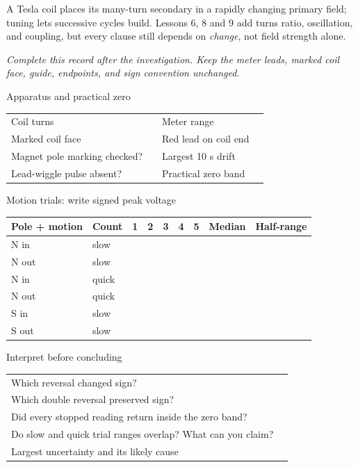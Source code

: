  A Tesla coil places its many-turn secondary
in a rapidly changing primary field; tuning lets successive cycles build.
Lessons 6, 8 and 9 add turns ratio, oscillation, and coupling, but every clause
still depends on \emph{change}, not field strength alone.
\lowvoltagenote

\clearpage
{}
\textit{Complete this record after the investigation. Keep the meter leads,
marked coil face, guide, endpoints, and sign convention unchanged.}

\begin{teloscard}{Apparatus and practical zero}
\begin{tabularx}{\linewidth}{@{}p{.28\linewidth}L p{.25\linewidth}L@{}}
\toprule
Coil turns & & Meter range & \\
Marked coil face & & Red lead on coil end & \\
Magnet pole marking checked? & & Largest 10 s drift & \\
Lead-wiggle pulse absent? & & Practical zero band & \\
\bottomrule
\end{tabularx}
\end{teloscard}

\begin{teloscard}{Motion trials: write signed peak voltage}
\small
\begin{tabularx}{\linewidth}{@{}p{.13\linewidth}p{.12\linewidth}*{5}{C}p{.12\linewidth}p{.12\linewidth}@{}}
\toprule
Pole + motion & Count & 1 & 2 & 3 & 4 & 5 & Median & Half-range\\
\midrule
N in & slow & & & & & & & \\[1.2em]
N out & slow & & & & & & & \\[1.2em]
N in & quick & & & & & & & \\[1.2em]
N out & quick & & & & & & & \\[1.2em]
S in & slow & & & & & & & \\[1.2em]
S out & slow & & & & & & & \\[1.2em]
\bottomrule
\end{tabularx}
\normalsize
\end{teloscard}

\begin{teloscard}{Interpret before concluding}
\begin{tabularx}{\linewidth}{@{}p{.34\linewidth}L@{}}
Which reversal changed sign? & \\
Which double reversal preserved sign? & \\[.7em]
Did every stopped reading return inside the zero band? & \\[.7em]
Do slow and quick trial ranges overlap? What can you claim? & \\[1.1em]
Largest uncertainty and its likely cause & \\[1.1em]
\end{tabularx}
\end{teloscard}

